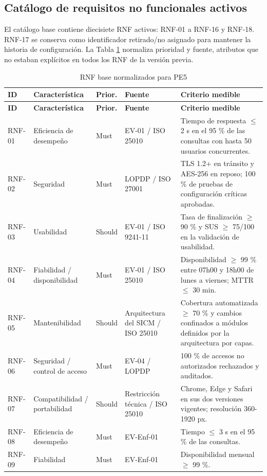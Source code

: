 \documentclass[11pt,a4paper]{article}
\begin{document}
	\subsection{Catálogo de requisitos no funcionales activos}
	El catálogo base contiene diecisiete RNF activos: RNF-01 a RNF-16 y RNF-18. RNF-17 se conserva como identificador retirado/no asignado para mantener la historia de configuración. La Tabla \ref{tab:rnfbase} normaliza prioridad y fuente, atributos que no estaban explícitos en todos los RNF de la versión previa.
	\begin{longtable}{p{1.5cm}p{2.98cm}p{1.5cm}p{2.8cm}p{6.4cm}}
		\caption{RNF base normalizados para PE5}\label{tab:rnfbase}\\
		\toprule\textbf{ID}&\textbf{Característica}&\textbf{Prior.}&\textbf{Fuente}&\textbf{Criterio medible}\\\midrule\endfirsthead
		\toprule\textbf{ID}&\textbf{Característica}&\textbf{Prior.}&\textbf{Fuente}&\textbf{Criterio medible}\\\midrule\endhead
		RNF-01 & Eficiencia de desempeño & Must & EV-01 / ISO 25010 & Tiempo de respuesta $\leq$ 2 s en el 95 \% de las consultas con hasta 50 usuarios concurrentes. \\
		RNF-02 & Seguridad & Must & LOPDP / ISO 27001 & TLS 1.2+ en tránsito y AES-256 en reposo; 100 \% de pruebas de configuración críticas aprobadas. \\
		RNF-03 & Usabilidad & Should & EV-01 / ISO 9241-11 & Tasa de finalización $\geq$ 90 \% y SUS $\geq$ 75/100 en la validación de usabilidad. \\
		RNF-04 & Fiabilidad / disponibilidad & Must & EV-01 / ISO 25010 & Disponibilidad $\geq$ 99 \% entre 07h00 y 18h00 de lunes a viernes; MTTR $\leq$ 30 min. \\
		RNF-05 & Mantenibilidad & Should & Arquitectura del SICM / ISO 25010 & Cobertura automatizada $\geq$ 70 \% y cambios confinados a módulos definidos por la arquitectura por capas. \\
		RNF-06 & Seguridad / control de acceso & Must & EV-04 / LOPDP & 100 \% de accesos no autorizados rechazados y auditados. \\
		RNF-07 & Compatibilidad / portabilidad & Should & Restricción técnica / ISO 25010 & Chrome, Edge y Safari en sus dos versiones vigentes; resolución 360-1920 px. \\
		RNF-08 & Eficiencia de desempeño & Must & EV-Enf-01 & Tiempo $\leq$ 3 s en el 95 \% de las consultas. \\
		RNF-09 & Fiabilidad & Must & EV-Enf-01 & Disponibilidad mensual $\geq$ 99 \%. \\

\end{longtable}
\end{document}
